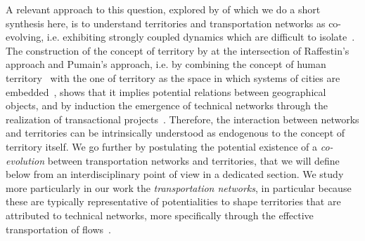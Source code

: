 \documentclass[11pt]{article}
\begin{document}
A relevant approach to this question, explored by \cite{raimbault2018caracterisation} of which we do a short synthesis here, is to understand territories and transportation networks as co-evolving, i.e. exhibiting strongly coupled dynamics which are difficult to isolate~\citep{bretagnolle:tel-00459720}. The construction of the concept of territory by \cite{raimbault2018caracterisation} at the intersection of Raffestin's approach and Pumain's approach, i.e. by combining the concept of human territory~\citep{raffestin1988reperes} with the one of territory as the space in which systems of cities are embedded~\citep{pumain2018evolutionary}, shows that it implies potential relations between geographical objects, and by induction the emergence of technical networks through the realization of transactional projects~\citep{dupuy1987vers}. Therefore, the interaction between networks and territories can be intrinsically understood as endogenous to the concept of territory itself. We go further by postulating the potential existence of a \emph{co-evolution} between transportation networks and territories, that we will define below from an interdisciplinary point of view in a dedicated section. We study more particularly in our work the \emph{transportation networks}, in particular because these are typically representative of potentialities to shape territories that are attributed to technical networks, more specifically through the effective transportation of flows~\citep{bavoux2005geographie}.
\end{document}
